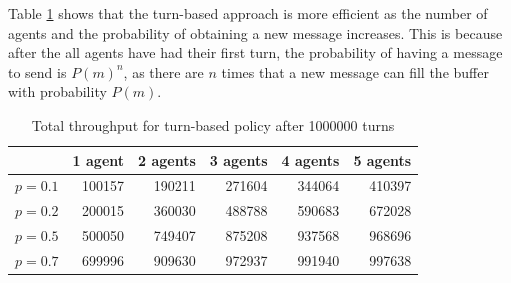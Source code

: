 \documentclass{article}
\begin{document}


	Table \ref{tab:turns} shows that the turn-based approach is more efficient
	as the number of agents and the probability of obtaining a new message
	increases. This is because after the all agents have had their first turn,
	the probability of having a message to send is $P(m)^n$, as there are
	$n$ times that a new message can fill the buffer with probability $P(m)$.

	\begin{table}[h]
		\centering
		\begin{tabular}{|r|rrrrr|}
			\hline
			& 1 agent & 2 agents & 3 agents& 4 agents& 5 agents\\
			\hline
			$p=0.1$ & 100157 & 190211 & 271604 & 344064 & 410397\\
			$p=0.2$ & 200015 & 360030 & 488788 & 590683 & 672028\\
			$p=0.5$ & 500050 & 749407 & 875208 & 937568 & 968696\\
			$p=0.7$ & 699996 & 909630 & 972937 & 991940 & 997638\\
			\hline
		\end{tabular}
		\caption{Total throughput for turn-based policy after 1000000 turns}
		\label{tab:turns}
	\end{table}
\end{document}
